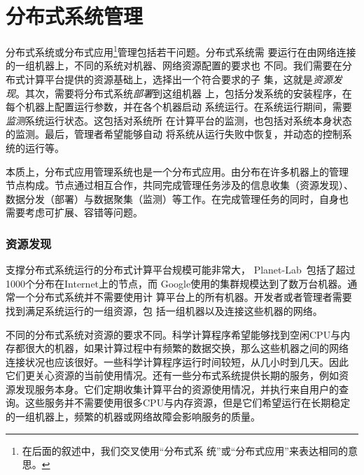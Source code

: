 % 
% 
% 
% 
% 

\section{分布式系统管理}
\label{sec:intro_mgmt}

分布式系统或分布式应用\footnote{在后面的叙述中，我们交叉使用“分布式系
统”或“分布式应用”来表达相同的意思。}管理包括若干问题。分布式系统需
要运行在由网络连接的一组机器上，不同的系统对机器、网络资源配置的要求也
不同。我们需要在分布式计算平台提供的资源基础上，选择出一个符合要求的子
集，这就是\emph{资源发现}。其次，需要将分布式系统\emph{部署}到这组机器
上，包括分发系统的安装程序，在每个机器上配置运行参数，并在各个机器启动
系统运行。在系统运行期间，需要\emph{监测}系统运行状态。这包括对系统所
在计算平台的监测，也包括对系统本身状态的监测。最后，管理者希望能够自动
将系统从运行失败中恢复，并动态的控制系统的运行等。

本质上，分布式应用管理系统也是一个分布式应用。由分布在许多机器上的管理
节点构成。节点通过相互合作，共同完成管理任务涉及的信息收集（资源发现）、
数据分发（部署）与数据聚集（监测）等工作。在完成管理任务的同时，自身也
需要考虑可扩展、容错等问题。

\subsubsection*{资源发现}

支撑分布式系统运行的分布式计算平台规模可能非常大，
Planet-Lab~\cite{Bavier2004}包括了超过1000个分布在Internet上的节点，而
Google使用的集群规模达到了数万台机器。通常一个分布式系统并不需要使用计
算平台上的所有机器。开发者或者管理者需要找到满足系统运行的一组资源，包
括一组机器以及连接这些机器的网络。

不同的分布式系统对资源的要求不同。科学计算程序希望能够找到空闲CPU与内
存都很大的机器，如果计算过程中有频繁的数据交换，那么这些机器之间的网络
连接状况也应该很好。一些科学计算程序运行时间较短，从几小时到几天。因此
它们更关心资源的当前使用情况。还有一些分布式系统提供长期的服务，例如资
源发现服务本身。它们定期收集计算平台的资源使用情况，并执行来自用户的查
询。这些服务并不需要使用很多CPU与内存资源，但是它们希望运行在长期稳定
的一组机器上，频繁的机器或网络故障会影响服务的质量。

